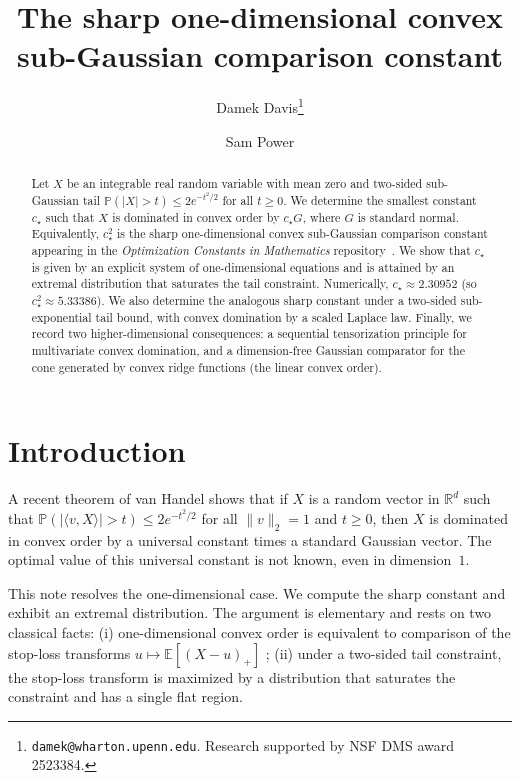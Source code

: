 \documentclass[11pt]{article}
\title{The sharp one-dimensional convex sub-Gaussian comparison constant}
\author[1]{Damek Davis\thanks{\texttt{damek@wharton.upenn.edu}. Research supported by NSF DMS award 2523384.}}
\author[2]{Sam Power}
\affil[1]{Department of Statistics and Data Science, The Wharton School, University of Pennsylvania}
\affil[2]{School of Mathematics, University of Bristol}
\date{}
\newcommand{\R}{\mathbb{R}}
\newcommand{\Pbb}{\mathbb{P}}
\newcommand{\Ebb}{\mathbb{E}}
\begin{document}
\maketitle

\begin{abstract}
Let $X$ be an integrable real random variable with mean zero and two-sided sub-Gaussian tail
$\mathbb{P}(|X|>t)\le 2e^{-t^{2}/2}$ for all $t\ge 0$.
We determine the smallest constant $c_\star$ such that $X$ is dominated in convex order by $c_\star G$,
where $G$ is standard normal.
Equivalently, $c_\star^2$ is the sharp one-dimensional convex sub-Gaussian comparison constant
appearing in the \emph{Optimization Constants in Mathematics} repository~\cite{optimization-constants-repo}.
We show that $c_\star$ is given by an explicit system of one-dimensional equations and is attained by an extremal distribution that saturates the tail constraint.
Numerically, $c_\star \approx 2.30952$ (so $c_\star^2 \approx 5.33386$). We also determine the analogous sharp constant under a two-sided sub-exponential tail bound, with convex domination by a scaled Laplace law.
Finally, we record two higher-dimensional consequences: a sequential tensorization principle for multivariate convex domination, and a dimension-free Gaussian comparator for the cone generated by convex ridge functions (the linear convex order).
\end{abstract}

\section{Introduction}

A recent theorem of van Handel \cite{vanHandelSubgComparison} shows that if $X$ is a random vector in $\R^d$ such that
$\Pbb (|\langle v, X \rangle| > t) \le 2e^{-t^{2}/2}$ for all $\|v\|_2 = 1$ and $t\ge 0$, then $X$ is dominated in convex order by a universal constant times a standard Gaussian vector.
The optimal value of this universal constant is not known, even in dimension~$1$.

This note resolves the one-dimensional case.
We compute the sharp constant and exhibit an extremal distribution.
The argument is elementary and rests on two classical facts: (i) one-dimensional convex order is equivalent to comparison of the stop-loss transforms $u\mapsto \Ebb[(X-u)_+]$ \cite[Ch.~3]{ShakedShanthikumar}; (ii) under a two-sided tail constraint, the stop-loss transform is maximized by a distribution that saturates the constraint and has a single flat region.
\end{document}
